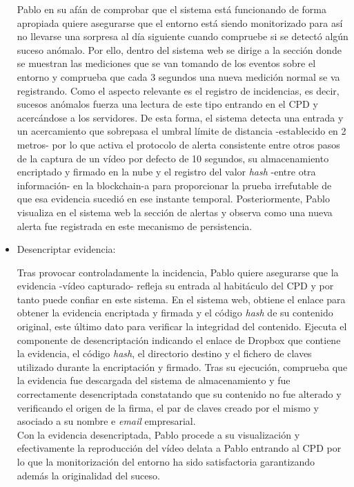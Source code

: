 \documentclass[12pt,a4paper, twoside]{report}
\begin{document}
\begin{itemize}
		Pablo en su afán de comprobar que el sistema está funcionando de forma apropiada quiere asegurarse que el entorno está siendo monitorizado para así no llevarse una sorpresa al día siguiente cuando compruebe si se detectó algún suceso anómalo. Por ello, dentro del sistema web se dirige a la sección donde se muestran las mediciones que se van tomando de los eventos sobre el entorno y comprueba que cada 3 segundos una nueva medición normal se va registrando. Como el aspecto relevante es el registro de incidencias, es decir, sucesos anómalos fuerza una lectura de este tipo entrando en el CPD y acercándose a los servidores. De esta forma, el sistema detecta una entrada y un acercamiento que sobrepasa el umbral límite de distancia -establecido en 2 metros- por lo que activa el protocolo de alerta consistente entre otros pasos de la captura de un vídeo por defecto de 10 segundos, su almacenamiento encriptado y firmado en la nube y el registro del valor \textit{hash} -entre otra información- en la \gls{blockchain-a} para proporcionar la prueba irrefutable de que esa evidencia sucedió en ese instante temporal. Posteriormente, Pablo visualiza en el sistema web la sección de alertas y observa como una nueva alerta fue registrada en este mecanismo de persistencia. 
		
		\item Desencriptar evidencia:

		Tras provocar controladamente la incidencia, Pablo quiere asegurarse que la evidencia -vídeo capturado- refleja su entrada al habitáculo del CPD y por tanto puede confiar en este sistema. En el sistema web, obtiene el enlace para obtener la evidencia encriptada y firmada y el código \textit{hash} de su contenido original, este último dato para verificar la integridad del contenido. Ejecuta el componente de desencriptación indicando el enlace de Dropbox que contiene la evidencia, el código \textit{hash}, el directorio destino y el fichero de claves utilizado durante la encriptación y firmado. Tras su ejecución, comprueba que la evidencia fue descargada del sistema de almacenamiento y fue correctamente desencriptada constatando que su contenido no fue alterado y verificando el origen de la firma, el par de claves creado por el mismo y asociado a su nombre e \textit{email} empresarial. \\
		
		Con la evidencia desencriptada, Pablo procede a su visualización y efectivamente la reproducción del vídeo delata a Pablo entrando al CPD por lo que la monitorización del entorno ha sido satisfactoria garantizando además la originalidad del suceso.
		

\end{itemize}
\end{document}
